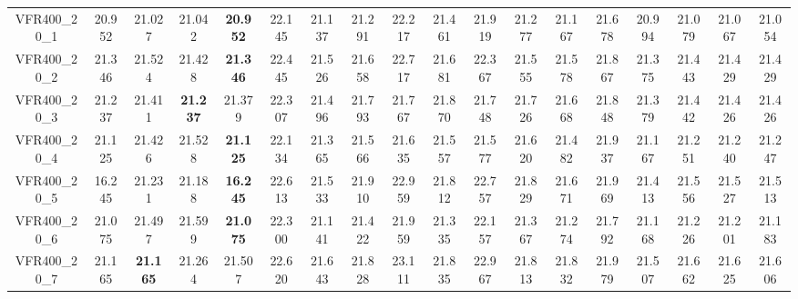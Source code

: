\begin{tabular}{cc|ccc|ccccccccccccc}
VFR400\_20\_1      & 20.952           & 21.027           & 21.042           & {\bf 20.952}     & 22.145           & 21.137           & 21.291           & 22.217           & 21.461           & 21.919           & 21.277           & 21.167           & 21.678           & 20.994           & 21.079           & 21.067           & 21.054          \\ 
VFR400\_20\_2      & 21.346           & 21.524           & 21.428           & {\bf 21.346}     & 22.445           & 21.526           & 21.658           & 22.717           & 21.681           & 22.367           & 21.555           & 21.578           & 21.867           & 21.375           & 21.443           & 21.429           & 21.429          \\ 
VFR400\_20\_3      & 21.237           & 21.411           & {\bf 21.237}     & 21.379           & 22.307           & 21.496           & 21.793           & 21.767           & 21.870           & 21.748           & 21.726           & 21.668           & 21.848           & 21.379           & 21.442           & 21.426           & 21.426          \\ 
VFR400\_20\_4      & 21.125           & 21.426           & 21.528           & {\bf 21.125}     & 22.134           & 21.365           & 21.566           & 21.635           & 21.557           & 21.577           & 21.620           & 21.482           & 21.937           & 21.167           & 21.251           & 21.240           & 21.247          \\ 
VFR400\_20\_5      & 16.245           & 21.231           & 21.188           & {\bf 16.245}     & 22.613           & 21.533           & 21.910           & 22.959           & 21.812           & 22.757           & 21.829           & 21.671           & 21.969           & 21.413           & 21.556           & 21.527           & 21.513          \\ 
VFR400\_20\_6      & 21.075           & 21.497           & 21.599           & {\bf 21.075}     & 22.300           & 21.141           & 21.422           & 21.959           & 21.335           & 22.157           & 21.367           & 21.274           & 21.792           & 21.168           & 21.226           & 21.201           & 21.183          \\ 
VFR400\_20\_7      & 21.165           & {\bf 21.165}     & 21.264           & 21.507           & 22.620           & 21.643           & 21.828           & 23.111           & 21.835           & 22.967           & 21.813           & 21.832           & 21.979           & 21.507           & 21.662           & 21.625           & 21.606          \\ 

\end{tabular}
